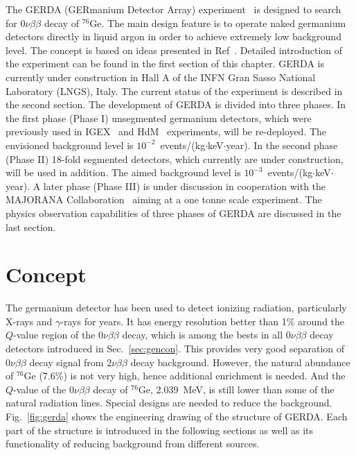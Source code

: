 The GERDA (GERmanium Detector Array) experiment~\cite{Sch05} is designed to search for $0\nu\beta\beta$ decay of $^{76}$Ge. The main design feature is to operate naked germanium detectors directly in liquid argon in order to achieve extremely low background level. The concept is based on ideas presented in Ref~\cite{Heu95}. Detailed introduction of the experiment can be found in the first section of this chapter. GERDA is currently under construction in Hall A of the INFN Gran Sasso National Laboratory (LNGS), Italy. The current status of the experiment is described in the second section. The development of GERDA is divided into three phases. In the first phase (Phase I) unsegmented germanium detectors, which were previously used in IGEX~\cite{Aal02} and HdM~\cite{Hei04} experiments, will be re-deployed. The envisioned background level is $10^{-2}$~events/(kg$\cdot$keV$\cdot$year). In the second phase (Phase II) 18-fold segmented detectors, which currently are under construction, will be used in addition. The aimed background level is $10^{-3}$~events/(kg$\cdot$keV$\cdot$year). A later phase (Phase III) is under discussion in cooperation with the MAJORANA Collaboration~\cite{Gai03,Aal04} aiming at a one tonne scale experiment. The physics observation capabilities of three phases of GERDA are discussed in the last section.

\section{Concept}
\label{sec:gerda:conc}
The germanium detector has been used to detect ionizing radiation, particularly X-rays and $\gamma$-rays for years. It has energy resolution better than 1\% around the $Q$-value region of the $0\nu\beta\beta$ decay, which is among the bests in all $0\nu\beta\beta$ decay detectors introduced in Sec.~\ref{sec:gencon}. This provides very good separation of $0\nu\beta\beta$ decay signal from $2\nu\beta\beta$ decay background. However, the natural abundance of $^{76}$Ge (7.6\%) is not very high, hence additional enrichment is needed. And the $Q$-value of the $0\nu\beta\beta$ decay of $^{76}$Ge, 2.039~MeV, is still lower than some of the natural radiation lines. Special designs are needed to reduce the background. Fig.~\ref{fig:gerda} shows the engineering drawing of the structure of GERDA. Each part of the structure is introduced in the following sections as well as its functionality of reducing background from different sources.

